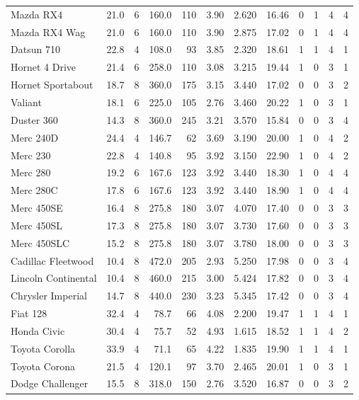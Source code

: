 \documentclass[a4paper, nobind]{templates/ociamthesis}
\begin{document}
\begin{landscape}
\begin{longtable}{lrrrrrrrrrrr}
\endfoot
\bottomrule
\endlastfoot
Mazda RX4 & 21.0 & 6 & 160.0 & 110 & 3.90 & 2.620 & 16.46 & 0 & 1 & 4 & 4\\
Mazda RX4 Wag & 21.0 & 6 & 160.0 & 110 & 3.90 & 2.875 & 17.02 & 0 & 1 & 4 & 4\\
Datsun 710 & 22.8 & 4 & 108.0 & 93 & 3.85 & 2.320 & 18.61 & 1 & 1 & 4 & 1\\
Hornet 4 Drive & 21.4 & 6 & 258.0 & 110 & 3.08 & 3.215 & 19.44 & 1 & 0 & 3 & 1\\
Hornet Sportabout & 18.7 & 8 & 360.0 & 175 & 3.15 & 3.440 & 17.02 & 0 & 0 & 3 & 2\\
\addlinespace
Valiant & 18.1 & 6 & 225.0 & 105 & 2.76 & 3.460 & 20.22 & 1 & 0 & 3 & 1\\
Duster 360 & 14.3 & 8 & 360.0 & 245 & 3.21 & 3.570 & 15.84 & 0 & 0 & 3 & 4\\
Merc 240D & 24.4 & 4 & 146.7 & 62 & 3.69 & 3.190 & 20.00 & 1 & 0 & 4 & 2\\
Merc 230 & 22.8 & 4 & 140.8 & 95 & 3.92 & 3.150 & 22.90 & 1 & 0 & 4 & 2\\
Merc 280 & 19.2 & 6 & 167.6 & 123 & 3.92 & 3.440 & 18.30 & 1 & 0 & 4 & 4\\
\addlinespace
Merc 280C & 17.8 & 6 & 167.6 & 123 & 3.92 & 3.440 & 18.90 & 1 & 0 & 4 & 4\\
Merc 450SE & 16.4 & 8 & 275.8 & 180 & 3.07 & 4.070 & 17.40 & 0 & 0 & 3 & 3\\
Merc 450SL & 17.3 & 8 & 275.8 & 180 & 3.07 & 3.730 & 17.60 & 0 & 0 & 3 & 3\\
Merc 450SLC & 15.2 & 8 & 275.8 & 180 & 3.07 & 3.780 & 18.00 & 0 & 0 & 3 & 3\\
Cadillac Fleetwood & 10.4 & 8 & 472.0 & 205 & 2.93 & 5.250 & 17.98 & 0 & 0 & 3 & 4\\
\addlinespace
Lincoln Continental & 10.4 & 8 & 460.0 & 215 & 3.00 & 5.424 & 17.82 & 0 & 0 & 3 & 4\\
Chrysler Imperial & 14.7 & 8 & 440.0 & 230 & 3.23 & 5.345 & 17.42 & 0 & 0 & 3 & 4\\
Fiat 128 & 32.4 & 4 & 78.7 & 66 & 4.08 & 2.200 & 19.47 & 1 & 1 & 4 & 1\\
Honda Civic & 30.4 & 4 & 75.7 & 52 & 4.93 & 1.615 & 18.52 & 1 & 1 & 4 & 2\\
Toyota Corolla & 33.9 & 4 & 71.1 & 65 & 4.22 & 1.835 & 19.90 & 1 & 1 & 4 & 1\\
\addlinespace
Toyota Corona & 21.5 & 4 & 120.1 & 97 & 3.70 & 2.465 & 20.01 & 1 & 0 & 3 & 1\\
Dodge Challenger & 15.5 & 8 & 318.0 & 150 & 2.76 & 3.520 & 16.87 & 0 & 0 & 3 & 2\\

\end{longtable}
\end{landscape}
\end{document}
